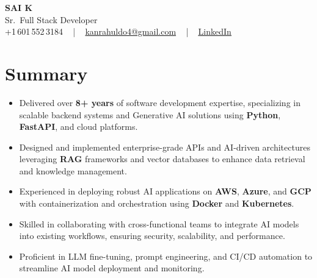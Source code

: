 \documentclass[letterpaper,11pt]{article}
\newcommand{\resumeItem}[1]{
  \item\footnotesize{
    {#1 \vspace{-2pt}}
  }
}
\newcommand{\resumeItemListStart}{\begin{itemize}[leftmargin=*]}
\newcommand{\resumeItemListEnd}{\end{itemize}\vspace{-5pt}}
\begin{document}
\begin{center}
    {\fontsize{14pt}{12pt}\selectfont \textbf{\MakeUppercase{Sai K}}}\\ \vspace{2pt}
    \fontsize{10pt}{12pt}\selectfont Sr.\ Full Stack Developer\\ \vspace{2pt}
    \fontsize{10pt}{12pt}\selectfont +1\,601\,552\,3184 ~ | ~
    \href{mailto:kanrahuldo4@gmail.com}{kanrahuldo4@gmail.com} ~ | ~
    \href{https://www.linkedin.com/in/srrrk/}{\color{blue}\underline{LinkedIn}}
    \vspace{-10pt}
\end{center}

\section{Summary}
\fontsize{9pt}{10pt}\selectfont
\resumeItemListStart
  \resumeItem{Delivered over \textbf{8+ years} of software development expertise, specializing in scalable backend systems and Generative AI solutions using \textbf{Python}, \textbf{FastAPI}, and cloud platforms.}
  \resumeItem{Designed and implemented enterprise-grade APIs and AI-driven architectures leveraging \textbf{RAG} frameworks and vector databases to enhance data retrieval and knowledge management.}
  \resumeItem{Experienced in deploying robust AI applications on \textbf{AWS}, \textbf{Azure}, and \textbf{GCP} with containerization and orchestration using \textbf{Docker} and \textbf{Kubernetes}.}
  \resumeItem{Skilled in collaborating with cross-functional teams to integrate AI models into existing workflows, ensuring security, scalability, and performance.}
  \resumeItem{Proficient in LLM fine-tuning, prompt engineering, and CI/CD automation to streamline AI model deployment and monitoring.}
\resumeItemListEnd
\vspace{-6pt}

\end{document}
